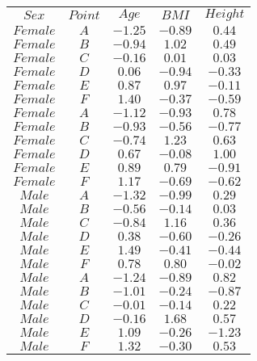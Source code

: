 \begin{tabular}{ccccc}
$Sex$ & $Point$ & $Age$ & $BMI$ & $Height$\\
$Female$ & $A$ & $-1.25$ & $-0.89$ & $0.44$\\
$Female$ & $B$ & $-0.94$ & $1.02$ & $0.49$\\
$Female$ & $C$ & $-0.16$ & $0.01$ & $0.03$\\
$Female$ & $D$ & $0.06$ & $-0.94$ & $-0.33$\\
$Female$ & $E$ & $0.87$ & $0.97$ & $-0.11$\\
$Female$ & $F$ & $1.40$ & $-0.37$ & $-0.59$\\
$Female$ & $A$ & $-1.12$ & $-0.93$ & $0.78$\\
$Female$ & $B$ & $-0.93$ & $-0.56$ & $-0.77$\\
$Female$ & $C$ & $-0.74$ & $1.23$ & $0.63$\\
$Female$ & $D$ & $0.67$ & $-0.08$ & $1.00$\\
$Female$ & $E$ & $0.89$ & $0.79$ & $-0.91$\\
$Female$ & $F$ & $1.17$ & $-0.69$ & $-0.62$\\
$Male$ & $A$ & $-1.32$ & $-0.99$ & $0.29$\\
$Male$ & $B$ & $-0.56$ & $-0.14$ & $0.03$\\
$Male$ & $C$ & $-0.84$ & $1.16$ & $0.36$\\
$Male$ & $D$ & $0.38$ & $-0.60$ & $-0.26$\\
$Male$ & $E$ & $1.49$ & $-0.41$ & $-0.44$\\
$Male$ & $F$ & $0.78$ & $0.80$ & $-0.02$\\
$Male$ & $A$ & $-1.24$ & $-0.89$ & $0.82$\\
$Male$ & $B$ & $-1.01$ & $-0.24$ & $-0.87$\\
$Male$ & $C$ & $-0.01$ & $-0.14$ & $0.22$\\
$Male$ & $D$ & $-0.16$ & $1.68$ & $0.57$\\
$Male$ & $E$ & $1.09$ & $-0.26$ & $-1.23$\\
$Male$ & $F$ & $1.32$ & $-0.30$ & $0.53$\\
\end{tabular}
